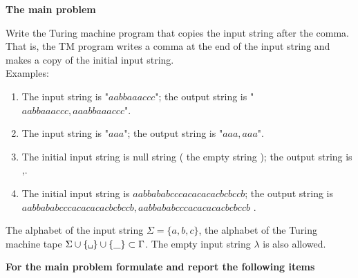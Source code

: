 \documentclass[12pt, a4paper, bibliography=totocnumbered]{report}
\newcommand{\vsp}{\vspace{-0.25cm}}
\begin{document}
{\bf The main problem}
\vsp
\begin{framed}
	Write the Turing machine program that copies the input string after the comma. That is, the TM program writes a comma at the end of the input string 
	and makes a copy of the initial input string.\\
	Examples:
	\begin{enumerate}
		\item The input string is "$ aabbaaaccc $"; the output string is "$ aabbaaaccc,aaabbaaaccc $".
		\item The input string is "$ aaa $"; the output string is "$ aaa , aaa $".
		\item The initial input string is null string ( the empty string ); the output string is ,.
		\item The initial input string is $ aabbababcccacacacacbcbccb $; the output string is $ aabbababcccacacacacbcbccb,aabbababcccacacacacbcbccb $ .
	\end{enumerate}
	The alphabet of the input string $\Sigma = \{a, b, c\}$, the alphabet of the Turing machine tape $ \Sigma \cup \{\texttt{\char32}\} \cup \{ \_ \} \subset \Gamma $. The empty input string $ \lambda $ is also allowed.
\end{framed}

{\bf For the main problem formulate and report the following items}
\end{document}
